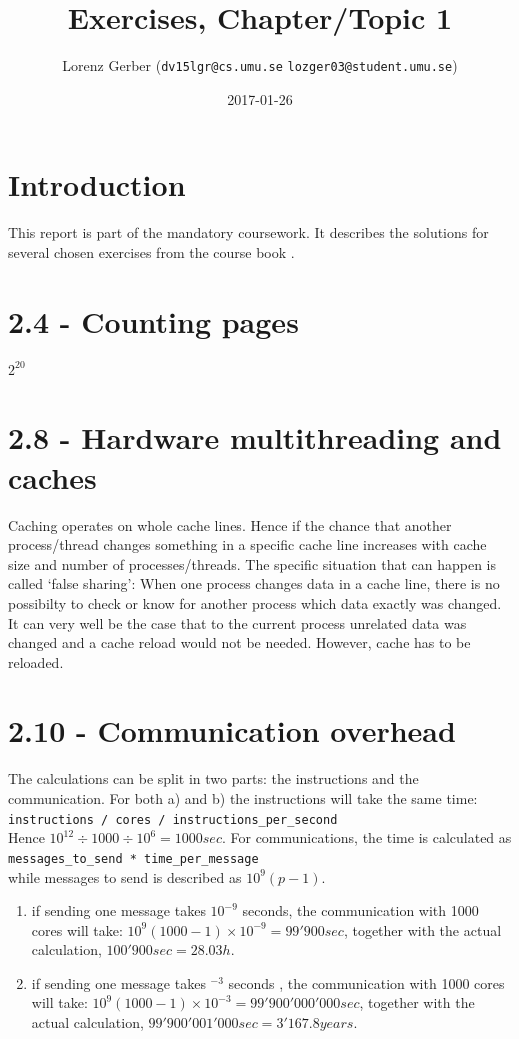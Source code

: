 \documentclass[a4paper,11pt,twoside]{article}
\title{Exercises, Chapter/Topic 1}
\author{Lorenz Gerber ({\tt{dv15lgr@cs.umu.se}} {\tt{lozger03@student.umu.se}})}
\date{2017-01-26}
\begin{document}
\lstset{language=C}
\maketitle
\thispagestyle{empty}
\newpage
\tableofcontents
\thispagestyle{empty}
\newpage

\clearpage
{}

\section{Introduction}
This report is part of the mandatory coursework. It describes the solutions for several chosen exercises from the course book \cite{pacheco2011}.
\section{2.4 - Counting pages}
$2^{20}$
\section{2.8 - Hardware multithreading and caches}
Caching operates on whole cache lines. Hence if the chance that another process/thread changes something in a specific cache line increases with cache size and number of processes/threads. The specific situation that can happen is called `false sharing': When one process changes data in a cache line, there is no possibilty to check or know for another process which data exactly was changed. It can very well be the case that to the current process unrelated data was changed and a cache reload would not be needed. However, cache has to be reloaded. 
\section{2.10 - Communication overhead}
The calculations can be split in two parts: the instructions and the communication. For both a) and b) the instructions will take the same time:\\
\verb+instructions / cores / instructions_per_second+\\
Hence $10^{12} \div 1000 \div 10^{6} = 1000 sec$. For communications, the time is calculated as\\
\verb+messages_to_send * time_per_message+\\
while messages to send is described as $10^{9}(p-1)$. 
\begin{enumerate}[label={\alph*)}]
\item if sending one message takes $10^{-9}$ seconds, the communication with 1000 cores will take: $10^{9}(1000-1) \times 10^{-9} = 99'900 sec$, together with the actual calculation, $100'900 sec = 28.03h$.
\item if sending one message takes $^{-3}$ seconds , the communication with 1000 cores will take: $10^{9}(1000-1) \times 10^{-3} = 99'900'000'000 sec$, together with the actual calculation, $99'900'001'000 sec = 3'167.8 years$.
\end{enumerate}
\end{document}
